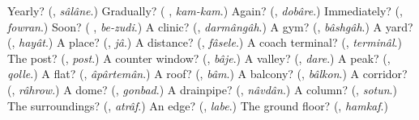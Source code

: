 \begin{tcolorbox}[breakable,colback=teal!4,colframe=teal!35!black,title={Before you move on}]
Yearly? (\textbf{}, \emph{sâlâne}.) Gradually? (\textbf{ }, \emph{kam-kam}.) Again? (\textbf{}, \emph{dobâre}.) Immediately? (\textbf{}, \emph{fowran}.) Soon? (\textbf{ }, \emph{be-zudi}.) A clinic? (\textbf{}, \emph{darmângâh}.) A gym? (\textbf{}, \emph{bâshgâh}.) A yard? (\textbf{}, \emph{hayât}.) A place? (\textbf{}, \emph{jâ}.) A distance? (\textbf{}, \emph{fâsele}.) A coach terminal? (\textbf{}, \emph{terminâl}.) The post? (\textbf{}, \emph{post}.) A counter window? (\textbf{}, \emph{bâje}.) A valley? (\textbf{}, \emph{dare}.) A peak? (\textbf{}, \emph{qolle}.) A flat? (\textbf{}, \emph{âpârtemân}.) A roof? (\textbf{}, \emph{bâm}.) A balcony? (\textbf{}, \emph{bâlkon}.) A corridor? (\textbf{}, \emph{râhrow}.) A dome? (\textbf{}, \emph{gonbad}.) A drainpipe? (\textbf{}, \emph{nâvdân}.) A column? (\textbf{}, \emph{sotun}.) The surroundings? (\textbf{}, \emph{atrâf}.) An edge? (\textbf{}, \emph{labe}.) The ground floor? (\textbf{}, \emph{hamkaf}.)
\end{tcolorbox}
